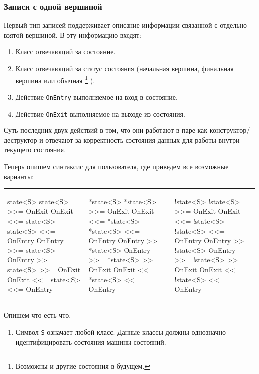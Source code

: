 \documentclass{article}
\begin{document}
{\subsubsection{Записи с одной вершиной}

Первый тип записей поддерживает описание информации связанной с отдельно взятой вершиной.
В эту информацию входят:
\begin{enumerate}
\item Класс отвечающий за состояние.

\item Класс отвечающий за статус состояния (начальная вершина, финальная вершина или обычная%
\footnote{Возможны и другие состояния в будущем.}
).

\item Действие \verb"OnEntry" выполняемое на вход в состояние.

\item Действие \verb"OnExit" выполняемое на выходе из состояния.
\end{enumerate}
Суть последних двух действий в том, что они работают в паре как конструктор/деструктор и отвечают за корректность состояния данных для работы внутри текущего состояния.

Теперь опишем синтаксис для пользователя, где приведем все возможные варианты:
\begin{center}
\begin{tabular}{lll}
{
\begin{minipage}[\baselineskip]{5.7cm}
\begin{cppcode}[\nonumbers]
state<S>
state<S> >>= OnExit
OnExit <<= state<S>
state<S> <<= OnEntry
OnEntry >>= state<S>
OnEntry >>= state<S> >>= OnExit
OnExit <<= state<S> <<= OnEntry
\end{cppcode}
\end{minipage}
}&{
\begin{minipage}[\baselineskip]{5.7cm}
\begin{cppcode}[\nonumbers]
*state<S>
*state<S> >>= OnExit
OnExit <<= *state<S>
*state<S> <<= OnEntry
OnEntry >>= *state<S>
OnEntry >>= *state<S> >>= OnExit
OnExit <<= *state<S> <<= OnEntry
\end{cppcode}
\end{minipage}
}&{
\begin{minipage}[\baselineskip]{5.7cm}
\begin{cppcode}[\nonumbers]
!state<S>
!state<S> >>= OnExit
OnExit <<= !state<S>
!state<S> <<= OnEntry
OnEntry >>= !state<S>
OnEntry >>= !state<S> >>= OnExit
OnExit <<= !state<S> <<= OnEntry
\end{cppcode}
\end{minipage}
}\\
\end{tabular}
\end{center}
Опишем что есть что.
\begin{enumerate}
\item Символ \verb"S" означает любой класс.
Данные классы должны однозначно идентифицировать состояния машины состояний.


\end{enumerate}}
\end{document}

